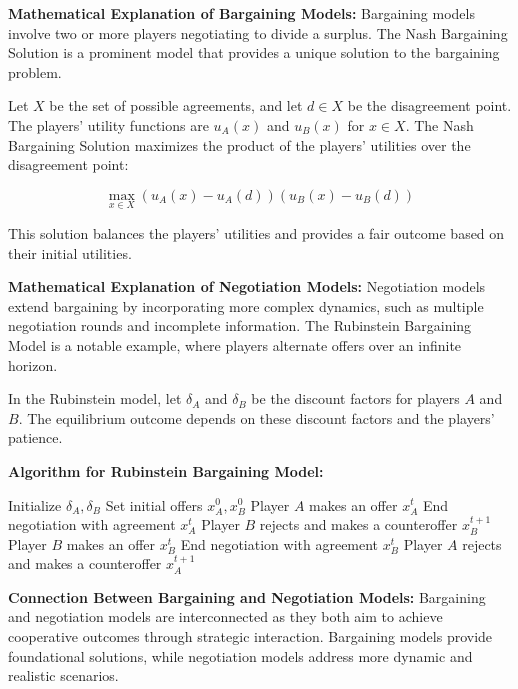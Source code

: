 \documentclass[12pt]{book} %
\begin{document}
\textbf{Mathematical Explanation of Bargaining Models:}
Bargaining models involve two or more players negotiating to divide a surplus. The Nash Bargaining Solution is a prominent model that provides a unique solution to the bargaining problem.

Let $X$ be the set of possible agreements, and let $d \in X$ be the disagreement point. The players' utility functions are $u_A(x)$ and $u_B(x)$ for $x \in X$. The Nash Bargaining Solution maximizes the product of the players' utilities over the disagreement point:

\[
\max_{x \in X} (u_A(x) - u_A(d))(u_B(x) - u_B(d))
\]

This solution balances the players' utilities and provides a fair outcome based on their initial utilities.

\textbf{Mathematical Explanation of Negotiation Models:}
Negotiation models extend bargaining by incorporating more complex dynamics, such as multiple negotiation rounds and incomplete information. The Rubinstein Bargaining Model is a notable example, where players alternate offers over an infinite horizon.

In the Rubinstein model, let $\delta_A$ and $\delta_B$ be the discount factors for players $A$ and $B$. The equilibrium outcome depends on these discount factors and the players' patience.

\textbf{Algorithm for Rubinstein Bargaining Model:}
\FloatBarrier
\begin{algorithm}
\caption{Rubinstein Bargaining Model}
\begin{algorithmic}
\State Initialize $\delta_A, \delta_B$
\State Set initial offers $x_A^0, x_B^0$
        \State Player $A$ makes an offer $x_A^t$
            \State End negotiation with agreement $x_A^t$
        \Else
            \State Player $B$ rejects and makes a counteroffer $x_B^{t+1}$
        \EndIf
    \Else
        \State Player $B$ makes an offer $x_B^t$
            \State End negotiation with agreement $x_B^t$
        \Else
            \State Player $A$ rejects and makes a counteroffer $x_A^{t+1}$
        \EndIf
    \EndIf
\EndFor
\end{algorithmic}
\end{algorithm}
\FloatBarrier

\textbf{Connection Between Bargaining and Negotiation Models:}
Bargaining and negotiation models are interconnected as they both aim to achieve cooperative outcomes through strategic interaction. Bargaining models provide foundational solutions, while negotiation models address more dynamic and realistic scenarios.
\end{document}
